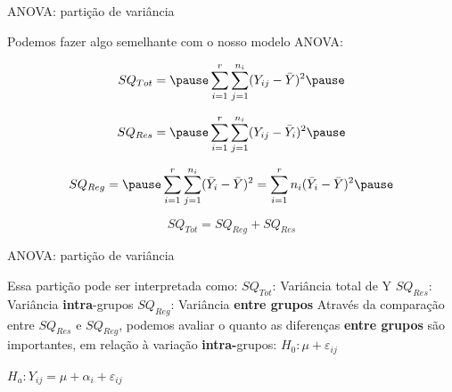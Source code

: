 \documentclass{beamer}\usepackage[]{graphicx}\usepackage[]{color}
\begin{document}
\begin{frame}{ANOVA: partição de variância}

Podemos fazer algo semelhante com o nosso modelo ANOVA: \pause

\begin{equation*}
SQ_{Tot} = \pause \sum_{i=1}^{r} \sum_{j=1}^{n_i}(Y_{ij} - \bar Y)^2 \pause
\end{equation*}

\begin{equation*}
SQ_{Res} = \pause \sum_{i=1}^{r} \sum_{j=1}^{n_i} (Y_{ij} - \bar Y_i)^2 \pause
\end{equation*}

\begin{equation*}
SQ_{Reg} = \pause \sum_{i=1}^{r} \sum_{j=1}^{n_i} (\bar Y_{i} - \bar Y)^2 = \sum_{i=1}^{r} n_i(\bar Y_i - \bar Y)^2 \pause
\end{equation*}

\begin{equation*}
SQ_{Tot} = SQ_{Reg} + SQ_{Res}
\end{equation*}

\end{frame}


\begin{frame}{ANOVA: partição de variância}

Essa partição pode ser interpretada como: \pause
\vfill
$SQ_{Tot}$: Variância total de Y \pause
\vfill
$SQ_{Res}$: Variância \textbf{intra}-grupos  \pause
\vfill
$SQ_{Reg}$:  Variância \textbf{entre grupos}
\vfill
Através da comparação entre $SQ_{Res}$ e $SQ_{Reg}$, podemos avaliar o quanto as diferenças \textbf{entre grupos} são importantes, em relação à variação \textbf{intra-}grupos: \pause
\vfill
$H_0: \mu + \varepsilon _{ij}$

$H_a: Y_{ij} = \mu + \alpha_i + \varepsilon _{ij}$  
\end{frame}
\end{document}
